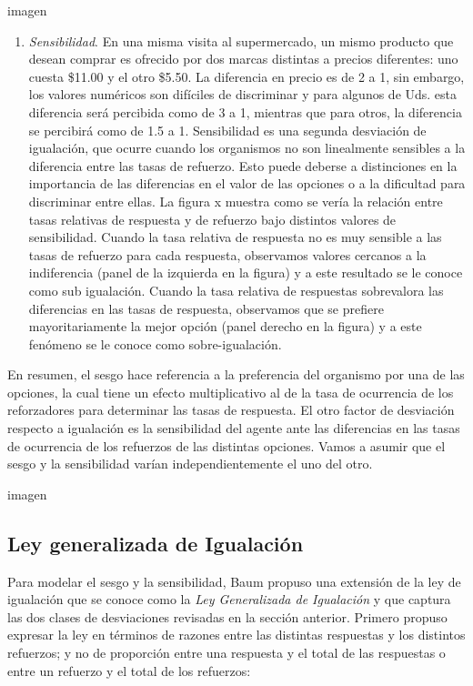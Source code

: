 \documentclass[
  letterpaper,
]{book}
\providecommand{\tightlist}{%
  \setlength{\itemsep}{0pt}\setlength{\parskip}{0pt}}\usepackage{longtable,booktabs,array}
\begin{document}
imagen

\begin{enumerate}
\def\labelenumi{\arabic{enumi}.}
\setcounter{enumi}{1}
\tightlist
\item
  \emph{Sensibilidad}. En una misma visita al supermercado, un mismo
  producto que desean comprar es ofrecido por dos marcas distintas a
  precios diferentes: uno cuesta \$11.00 y el otro \$5.50. La diferencia
  en precio es de 2 a 1, sin embargo, los valores numéricos son
  difíciles de discriminar y para algunos de Uds. esta diferencia será
  percibida como de 3 a 1, mientras que para otros, la diferencia se
  percibirá como de 1.5 a 1. Sensibilidad es una segunda desviación de
  igualación, que ocurre cuando los organismos no son linealmente
  sensibles a la diferencia entre las tasas de refuerzo. Esto puede
  deberse a distinciones en la importancia de las diferencias en el
  valor de las opciones o a la dificultad para discriminar entre ellas.
  La figura x muestra como se vería la relación entre tasas relativas de
  respuesta y de refuerzo bajo distintos valores de sensibilidad. Cuando
  la tasa relativa de respuesta no es muy sensible a las tasas de
  refuerzo para cada respuesta, observamos valores cercanos a la
  indiferencia (panel de la izquierda en la figura) y a este resultado
  se le conoce como sub igualación. Cuando la tasa relativa de
  respuestas sobrevalora las diferencias en las tasas de respuesta,
  observamos que se prefiere mayoritariamente la mejor opción (panel
  derecho en la figura) y a este fenómeno se le conoce como
  sobre-igualación.
\end{enumerate}

En resumen, el sesgo hace referencia a la preferencia del organismo por
una de las opciones, la cual tiene un efecto multiplicativo al de la
tasa de ocurrencia de los reforzadores para determinar las tasas de
respuesta. El otro factor de desviación respecto a igualación es la
sensibilidad del agente ante las diferencias en las tasas de ocurrencia
de los refuerzos de las distintas opciones. Vamos a asumir que el sesgo
y la sensibilidad varían independientemente el uno del otro.

imagen

\subsection{Ley generalizada de
Igualación}\label{ley-generalizada-de-igualaciuxf3n}

Para modelar el sesgo y la sensibilidad, Baum propuso una extensión de
la ley de igualación que se conoce como la \emph{Ley Generalizada de
Igualación} y que captura las dos clases de desviaciones revisadas en la
sección anterior. Primero propuso expresar la ley en términos de razones
entre las distintas respuestas y los distintos refuerzos; y no de
proporción entre una respuesta y el total de las respuestas o entre un
refuerzo y el total de los refuerzos:
\end{document}
